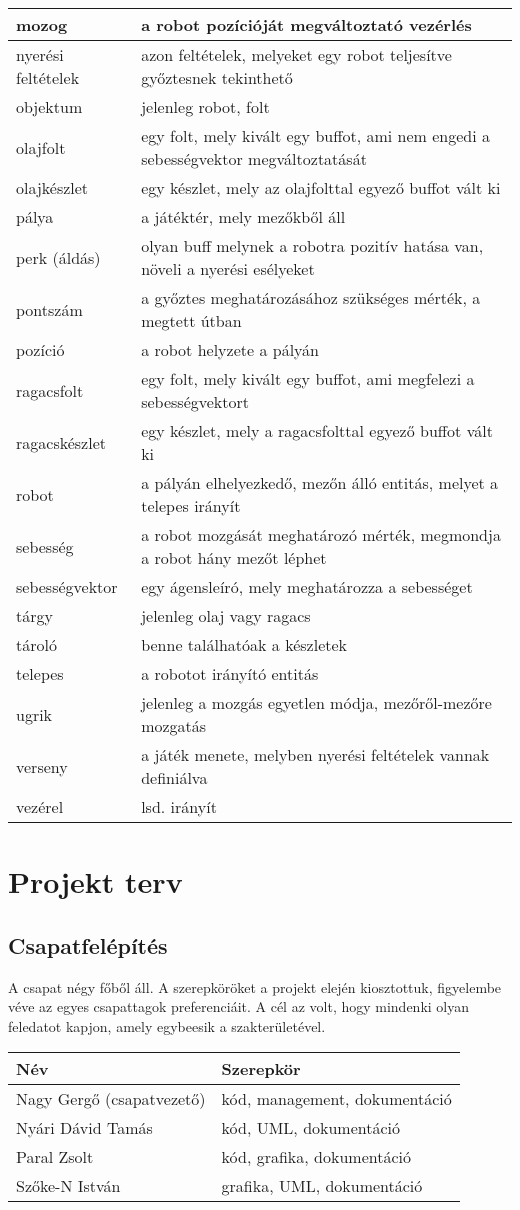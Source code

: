 \begin{tabularx}{\textwidth}{| l | l |}
    mozog &  a robot pozícióját megváltoztató vezérlés \tabularnewline \hline
    nyerési feltételek &  azon feltételek, melyeket egy robot teljesítve győztesnek tekinthető \tabularnewline \hline
    objektum &  jelenleg robot, folt \tabularnewline \hline
    olajfolt &  egy folt, mely kivált egy buffot, ami nem engedi a sebességvektor megváltoztatását \tabularnewline \hline
    olajkészlet &  egy készlet, mely az olajfolttal egyező buffot vált ki \tabularnewline \hline
    pálya &  a játéktér, mely mezőkből áll \tabularnewline \hline
    perk (áldás) & olyan buff melynek a robotra pozitív hatása van, növeli a nyerési esélyeket  \tabularnewline \hline
    pontszám &  a győztes meghatározásához szükséges mérték, a megtett útban \tabularnewline \hline
    pozíció &  a robot helyzete a pályán \tabularnewline \hline
    ragacsfolt &  egy folt, mely kivált egy buffot, ami megfelezi a sebességvektort \tabularnewline \hline
    ragacskészlet &  egy készlet, mely a ragacsfolttal egyező buffot vált ki \tabularnewline \hline
    robot &  a pályán elhelyezkedő, mezőn álló entitás, melyet a telepes irányít \tabularnewline \hline
    sebesség &  a robot mozgását meghatározó mérték, megmondja a robot hány mezőt léphet \tabularnewline \hline
    sebességvektor &  egy ágensleíró, mely meghatározza a sebességet \tabularnewline \hline
    tárgy & jelenleg olaj vagy ragacs   \tabularnewline \hline
    tároló &  benne találhatóak a készletek \tabularnewline \hline
    telepes &  a robotot irányító entitás \tabularnewline \hline
    ugrik &  jelenleg a mozgás egyetlen módja, mezőről-mezőre mozgatás \tabularnewline \hline
    verseny &  a játék menete, melyben nyerési feltételek vannak definiálva \tabularnewline \hline
    vezérel & lsd. irányít \tabularnewline \hline
\end{tabularx}

\section{Projekt terv}
\subsection{Csapatfelépítés}
A csapat négy főből áll. A szerepköröket a projekt elején kiosztottuk, figyelembe véve az egyes csapattagok preferenciáit. A cél az volt, hogy mindenki olyan feledatot kapjon, amely egybeesik a szakterületével.

\begin{tabularx}{\textwidth}{| l | l |}
\hline
\textbf{Név} & \textbf{Szerepkör} \tabularnewline 
\hline\hline
Nagy Gergő (csapatvezető) & kód, management, dokumentáció \tabularnewline \hline
Nyári Dávid Tamás & kód, UML, dokumentáció \tabularnewline \hline
Paral Zsolt & kód, grafika, dokumentáció \tabularnewline \hline
Szőke-N István & grafika, UML, dokumentáció \tabularnewline \hline
\end{tabularx}

